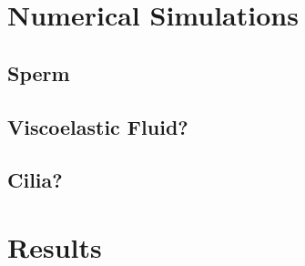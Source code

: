 \section{Numerical Simulations}
\subsection{Sperm}
\subsection{Viscoelastic Fluid?}
\subsection{Cilia?}
\section{Results}